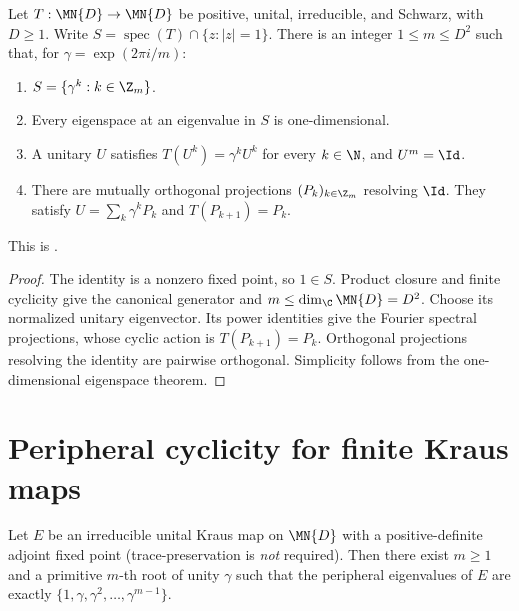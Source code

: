 \begin{theorem}
    \label{thm:wolf_irreducible_schwarz_peripheral}
    \leanok
    Let $T:\MN{D}\to\MN{D}$ be positive, unital, irreducible, and Schwarz,
    with $D\geq1$. Write $S=\operatorname{spec}(T)\cap\{z:|z|=1\}$.
    There is an integer $1\leq m\leq D^2$ such that, for
    $\gamma=\exp(2\pi i/m)$:
    \begin{enumerate}
        \item $S=\{\gamma^k:k\in\Z_m\}$.
        \item Every eigenspace at an eigenvalue in $S$ is one-dimensional.
        \item A unitary $U$ satisfies $T(U^k)=\gamma^kU^k$ for every
              $k\in\N$, and $U^m=\Id$.
        \item There are mutually orthogonal projections $(P_k)_{k\in\Z_m}$
              resolving $\Id$. They satisfy $U=\sum_k\gamma^kP_k$ and
              $T(P_{k+1})=P_k$.
    \end{enumerate}
    This is \cite[Theorem~6.6]{Wolf2012Quantum}.
\end{theorem}

\begin{proof}\leanok
    The identity is a nonzero fixed point, so $1\in S$. Product closure
    and finite cyclicity give the canonical generator and
    $m\leq\dim_{\C}\MN{D}=D^2$. Choose its normalized unitary eigenvector.
    Its power identities give the Fourier spectral projections, whose
    cyclic action is $T(P_{k+1})=P_k$. Orthogonal projections resolving the
    identity are pairwise orthogonal. Simplicity follows from the
    one-dimensional eigenspace theorem.
\end{proof}



\section{Peripheral cyclicity for finite Kraus maps}

\begin{theorem}%
    \label{thm:peripheral_cyclic_structure}
    \leanok
    Let $E$ be an irreducible unital Kraus map on $\MN{D}$ with a
    positive-definite adjoint fixed point (trace-preservation is \emph{not}
    required).
    Then there exist $m \ge 1$ and a primitive $m$-th root of unity
    $\gamma$ such that the peripheral eigenvalues of $E$ are exactly
    $\{1,\gamma,\gamma^2,\ldots,\gamma^{m-1}\}$.
\end{theorem}


